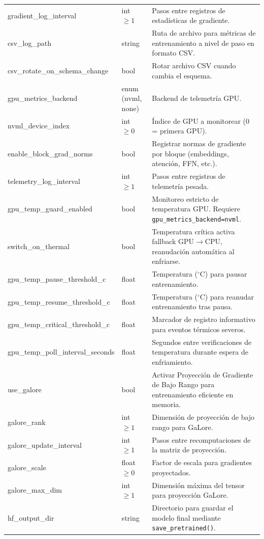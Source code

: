 \begin{longtable}{>{\ttfamily\footnotesize\raggedright\arraybackslash}p{5.6cm}>{\raggedright\arraybackslash}p{2.4cm}>{\raggedright\arraybackslash}p{6.9cm}}
gradient\_log\_interval & int $\ge 1$ & Pasos entre registros de estadísticas de gradiente. \\
csv\_log\_path & string & Ruta de archivo para métricas de entrenamiento a nivel de paso en formato CSV. \\
csv\_rotate\_on\_schema\_change & bool & Rotar archivo CSV cuando cambia el esquema. \\
gpu\_metrics\_backend & enum (nvml, none) & Backend de telemetría GPU. \\
nvml\_device\_index & int $\ge 0$ & Índice de GPU a monitorear (0 = primera GPU). \\
enable\_block\_grad\_norms & bool & Registrar normas de gradiente por bloque (embeddings, atención, FFN, etc.). \\
telemetry\_log\_interval & int $\ge 1$ & Pasos entre registros de telemetría pesada. \\
gpu\_temp\_guard\_enabled & bool & Monitoreo estricto de temperatura GPU. Requiere \texttt{gpu\_metrics\_backend=nvml}. \\
switch\_on\_thermal & bool & Temperatura crítica activa fallback GPU$\to$CPU, reanudación automática al enfriarse. \\
gpu\_temp\_pause\_threshold\_c & float & Temperatura ($^\circ$C) para pausar entrenamiento. \\
gpu\_temp\_resume\_threshold\_c & float & Temperatura ($^\circ$C) para reanudar entrenamiento tras pausa. \\
gpu\_temp\_critical\_threshold\_c & float & Marcador de registro informativo para eventos térmicos severos. \\
gpu\_temp\_poll\_interval\_seconds & float & Segundos entre verificaciones de temperatura durante espera de enfriamiento. \\
use\_galore & bool & Activar Proyección de Gradiente de Bajo Rango para entrenamiento eficiente en memoria. \\
galore\_rank & int $\ge 1$ & Dimensión de proyección de bajo rango para GaLore. \\
galore\_update\_interval & int $\ge 1$ & Pasos entre recomputaciones de la matriz de proyección. \\
galore\_scale & float $\ge 0$ & Factor de escala para gradientes proyectados. \\
galore\_max\_dim & int $\ge 1$ & Dimensión máxima del tensor para proyección GaLore. \\
hf\_output\_dir & string & Directorio para guardar el modelo final mediante \texttt{save\_pretrained()}. \\
\end{longtable}

